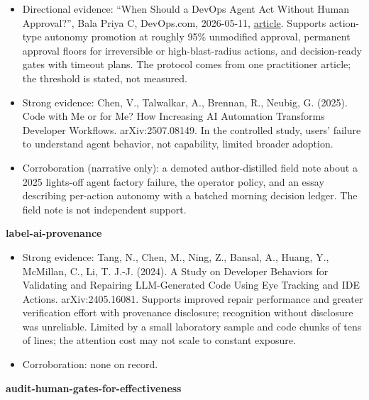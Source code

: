 \begin{itemize}
\tightlist
\item
  Directional evidence: ``When Should a DevOps Agent Act Without Human Approval?'', Bala Priya C, DevOps.com, 2026-05-11, \href{https://devops.com/when-should-a-devops-agent-act-without-human-approval/}{article}. Supports action-type autonomy promotion at roughly 95\% unmodified approval, permanent approval floors for irreversible or high-blast-radius actions, and decision-ready gates with timeout plans. The protocol comes from one practitioner article; the threshold is stated, not measured.
\item
  Strong evidence: Chen, V., Talwalkar, A., Brennan, R., Neubig, G. (2025). Code with Me or for Me? How Increasing AI Automation Transforms Developer Workflows. arXiv:2507.08149. In the controlled study, users' failure to understand agent behavior, not capability, limited broader adoption.
\item
  Corroboration (narrative only): a demoted author-distilled field note about a 2025 lights-off agent factory failure, the operator policy, and an essay describing per-action autonomy with a batched morning decision ledger. The field note is not independent support.
\end{itemize}

\textbf{label-ai-provenance}

\begin{itemize}
\tightlist
\item
  Strong evidence: Tang, N., Chen, M., Ning, Z., Bansal, A., Huang, Y., McMillan, C., Li, T. J.-J. (2024). A Study on Developer Behaviors for Validating and Repairing LLM-Generated Code Using Eye Tracking and IDE Actions. arXiv:2405.16081. Supports improved repair performance and greater verification effort with provenance disclosure; recognition without disclosure was unreliable. Limited by a small laboratory sample and code chunks of tens of lines; the attention cost may not scale to constant exposure.
\item
  Corroboration: none on record.
\end{itemize}

\textbf{audit-human-gates-for-effectiveness}

